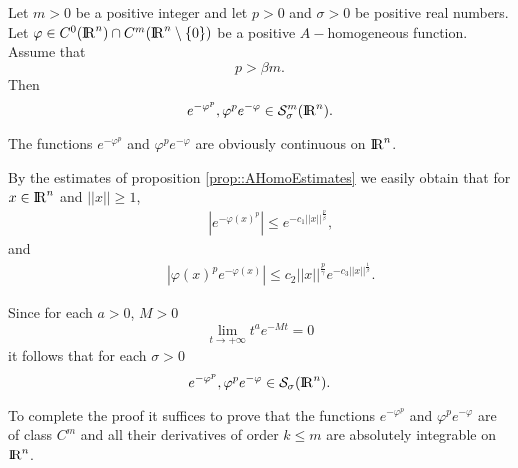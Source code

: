\documentclass[12pt,a4paper]{amsart}
\begin{document}
{\begin{theorem}\label{thm::ThetaDecay}
Let ${m}>0$ be a positive integer and let
${p}>0$ and ${\sigma}>0$ be positive real numbers.
Let ${\varphi}\in C^0({{\rm I\kern-.185em R}}^{n})\cap C^{m}({{\rm I\kern-.185em R}}^{n}\setminus\{0\})$
be a positive ${A}-$homogeneous function.
Assume that
\begin{equation}\nonumber
{p}>{\beta}{m}.
\end{equation}
Then
\begin{equation}\nonumber
e^{-{\varphi}^{p}},
{\varphi}^{p} e^{-{\varphi}}
\in{{\mathcal{S}}_{\sigma}^{m}({{\rm I\kern-.185em R}}^{n})}.
\end{equation}
\end{theorem}

{\removelastskip\par\medskip\goodbreak{}} {

The functions $e^{-{\varphi}^{p}}$
and ${\varphi}^{p} e^{-{\varphi}}$ are
obviously continuous on ${{\rm I\kern-.185em R}}^{n}$.

By the estimates of proposition \ref{prop::AHomoEstimates}
we easily obtain that for ${x}\in{{\rm I\kern-.185em R}}^{n}$
and ${\left|\!\left|{x}\right|\!\right|}\geq1$,
\begin{eqnarray}
	&&{\left|{e^{-{\varphi}({x})^{p}}}\right|}
		\leq e^{-{c}_1{\left|\!\left|{x}\right|\!\right|}^{\frac{p}{\beta}}},
\nonumber
\end{eqnarray}
and
\begin{eqnarray}
	&&{\left|{{\varphi}({x})^{p} e^{-{\varphi}({x})}}\right|}
		\leq{c}_2{\left|\!\left|{x}\right|\!\right|}^{\frac{p}{\gamma}}
			e^{-{c}_3{\left|\!\left|{x}\right|\!\right|}^{\frac{1}{\beta}}}.
\nonumber
\end{eqnarray}

Since for each $a>0$, $M>0$
\begin{equation}\nonumber
	\lim_{t\to+\infty}t^ae^{-Mt}=0
\end{equation}
it follows that for each ${\sigma}>0$
\begin{equation}\nonumber
e^{-{\varphi}^{p}},
{\varphi}^{p} e^{-{\varphi}}
\in{{\mathcal{S}}_{\sigma}({{\rm I\kern-.185em R}}^{n})}.
\end{equation}

To complete the proof it suffices to prove that
the functions $e^{-{\varphi}^{p}}$
and ${\varphi}^{p} e^{-{\varphi}}$ are
of class $C^{m}$ and all their derivatives
of order ${k}\leq{m}$ are absolutely integrable
on ${{\rm I\kern-.185em R}}^{n}$.

}}
\end{document}
